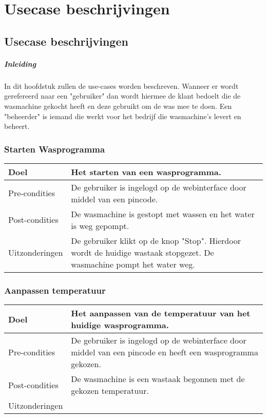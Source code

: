 \chapter{Usecase beschrijvingen}
\section{Usecase beschrijvingen}
\paragraph{Inleiding}
In dit hoofdstuk zullen de use-cases worden beschreven.
Wanneer er wordt gerefereerd naar een "gebruiker" dan wordt hiermee de klant bedoelt die de wasmachine gekocht heeft en deze gebruikt om de was mee te doen.
Een "beheerder" is iemand die werkt voor het bedrijf die wasmachine's levert en beheert.

\subsection{Starten Wasprogramma}
\begin{center}
  \begin{tabular}{ | p{4cm} | p{8.5cm} | } %
    \hline
    Doel & Het starten van een wasprogramma. \\ \hline
    Pre-condities & De gebruiker is ingelogd op de webinterface door middel van een pincode. \\ \hline
    Post-condities & De wasmachine is gestopt met wassen en het water is weg gepompt. \\ \hline
    Uitzonderingen & De gebruiker klikt op de knop "Stop". Hierdoor wordt de huidige wastaak stopgezet. De wasmachine pompt het water weg. \\
    \hline
  \end{tabular}
\end{center}

\subsection{Aanpassen temperatuur}
\begin{center}
  \begin{tabular}{ | p{4cm} | p{8.5cm} | } %
    \hline
    Doel & Het aanpassen van de temperatuur van het huidige wasprogramma. \\ \hline
    Pre-condities & De gebruiker is ingelogd op de webinterface door middel van een pincode en heeft een wasprogramma gekozen. \\ \hline
    Post-condities & De wasmachine is een wastaak begonnen met de gekozen temperatuur. \\ \hline
    Uitzonderingen &  \\
    \hline
  \end{tabular}
\end{center}

